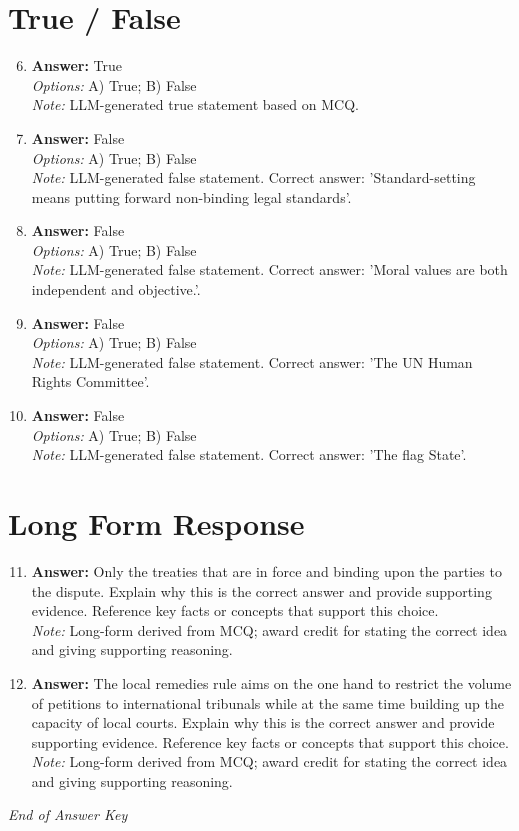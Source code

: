 \documentclass[12pt]{article}
\begin{document}
\section*{True / False}
\begin{enumerate}[label=\arabic*.]
\setcounter{enumi}{5}
\item \textbf{Answer:} True
\\ \textit{Options:} A) True; B) False
\\ \textit{Note:} LLM-generated true statement based on MCQ.
\item \textbf{Answer:} False
\\ \textit{Options:} A) True; B) False
\\ \textit{Note:} LLM-generated false statement. Correct answer: 'Standard-setting means putting forward non-binding legal standards'.
\item \textbf{Answer:} False
\\ \textit{Options:} A) True; B) False
\\ \textit{Note:} LLM-generated false statement. Correct answer: 'Moral values are both independent and objective.'.
\item \textbf{Answer:} False
\\ \textit{Options:} A) True; B) False
\\ \textit{Note:} LLM-generated false statement. Correct answer: 'The UN Human Rights Committee'.
\item \textbf{Answer:} False
\\ \textit{Options:} A) True; B) False
\\ \textit{Note:} LLM-generated false statement. Correct answer: 'The flag State'.
\end{enumerate}

\section*{Long Form Response}
\begin{enumerate}[label=\arabic*.]
\setcounter{enumi}{10}
\item \textbf{Answer:} Only the treaties that are in force and binding upon the parties to the dispute. Explain why this is the correct answer and provide supporting evidence. Reference key facts or concepts that support this choice.
\\ \textit{Note:} Long-form derived from MCQ; award credit for stating the correct idea and giving supporting reasoning.
\item \textbf{Answer:} The local remedies rule aims on the one hand to restrict the volume of petitions to international tribunals while at the same time building up the capacity of local courts. Explain why this is the correct answer and provide supporting evidence. Reference key facts or concepts that support this choice.
\\ \textit{Note:} Long-form derived from MCQ; award credit for stating the correct idea and giving supporting reasoning.
\end{enumerate}

\vfill
\noindent\textit{End of Answer Key}
\end{document}
